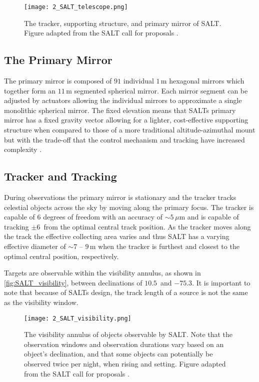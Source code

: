 \begin{figure}[t]
    \centering
    \texttt{[image: 2\_SALT\_telescope.png]}
    \caption{
        The tracker, supporting structure, and primary mirror of \gls{SALT}.
        Figure adapted from the \gls{SALT} call for proposals \citep{SALT_CFP}.
    }
    \label{fig:SALT_telescope}
\end{figure}

\subsection{The Primary Mirror}

The primary mirror is composed of $91$ individual $1$\,m hexagonal mirrors which together form an $11$\,m segmented spherical mirror.
Each mirror segment can be adjusted by actuators allowing the individual mirrors to approximate a single monolithic spherical mirror.
The fixed elevation means that \glspl{SALT} primary mirror has a fixed gravity vector allowing for a lighter, cost-effective supporting structure when compared to those of a more traditional altitude-azimuthal mount but with the trade-off that the control mechanism and tracking have increased complexity \citep{SALT_design}.

\subsection{Tracker and Tracking}

During observations the primary mirror is stationary and the tracker tracks celestial objects across the sky by moving along the primary focus.
The tracker is capable of $6$ degrees of freedom with an accuracy of $\sim 5$\,$\mu$m and is capable of tracking $\pm 6$\degree\ from the optimal central track position.
As the tracker moves along the track the effective collecting area varies and thus \gls{SALT} has a varying effective diameter of $\sim 7$ -- $9$\,m when the tracker is furthest and closest to the optimal central position, respectively.

Targets are observable within the visibility annulus, as shown in \autoref{fig:SALT_visibility}, between declinations of $10.5$\degree\ and $-75.3$\degree.
It is important to note that because of \glspl{SALT} design, the track length of a source is not the same as the visibility window.

\begin{figure}[t]
    \centering
    \texttt{[image: 2\_SALT\_visibility.png]}
    \caption{
        The visibility annulus of objects observable by \gls{SALT}.
        Note that the observation windows and observation durations vary based on an object's declination, and that some objects can potentially be observed twice per night, when rising and setting.
        Figure adapted from the \gls{SALT} call for proposals \citep{SALT_CFP}.
    }
    \label{fig:SALT_visibility}
\end{figure}

